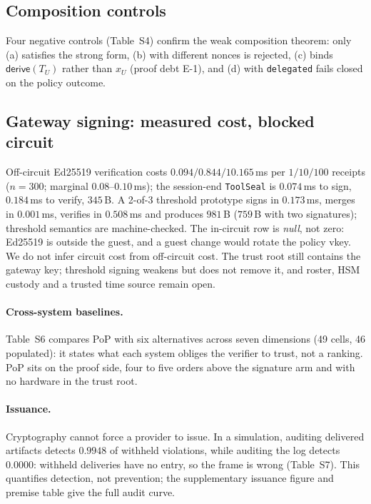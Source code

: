 \documentclass[10pt,journal,compsoc]{IEEEtran}
\begin{document}
\subsection{Composition controls}
\label{sec:eval-compose}

Four negative controls (Table~S4) confirm the weak composition theorem: only
(a) satisfies the strong form, (b) with different nonces is rejected, (c) binds
$\mathsf{derive}(T_U)$ rather than $x_U$ (proof debt E-1), and (d) with
\texttt{delegated} fails closed on the policy outcome.

\subsection{Gateway signing: measured cost, blocked circuit}
\label{sec:eval-gateway}
Off-circuit Ed25519 verification costs $0.094/0.844/10.165$\,ms per
$1/10/100$ receipts ($n=300$; marginal $0.08$--$0.10$\,ms); the session-end
\texttt{ToolSeal} is $0.074$\,ms to sign, $0.184$\,ms to verify, $345$\,B. A
2-of-3 threshold prototype signs in $0.173$\,ms, merges in $0.001$\,ms,
verifies in $0.508$\,ms and produces $981$\,B ($759$\,B with two signatures);
threshold semantics are machine-checked. The in-circuit row is \emph{null}, not
zero: Ed25519 is outside the guest, and a guest change would rotate the policy
vkey. We do not infer circuit cost from off-circuit cost. The trust root still
contains the gateway key; threshold signing weakens but does not remove it, and
roster, HSM custody and a trusted time source remain open.

\paragraph{Cross-system baselines.}\label{sec:eval-baselines}
Table~S6 compares PoP with six alternatives across seven dimensions (49 cells,
46 populated): it states what each system obliges the verifier to trust, not a
ranking. PoP sits on the proof side, four to five orders above the signature
arm and with no hardware in the trust root.

\paragraph{Issuance.}\label{sec:eval-issuance}
Cryptography cannot force a provider to issue. In a simulation, auditing
delivered artifacts detects $0.9948$ of withheld violations, while auditing the
log detects $0.0000$: withheld deliveries have no entry, so the frame is wrong
(Table~S7). This quantifies detection, not prevention; the supplementary issuance figure
and premise table give the full audit curve.
\end{document}

